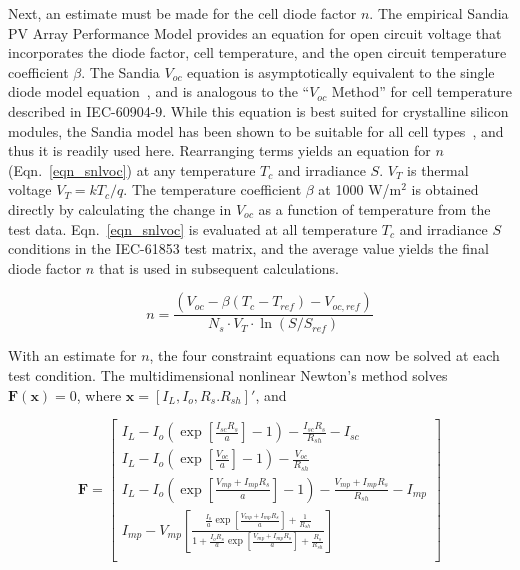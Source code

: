 \documentclass[12pt,letterpaper]{article}
\begin{document}
Next, an estimate must be made for the cell diode factor $n$.  The empirical Sandia PV Array Performance Model provides an equation for open circuit voltage that incorporates the diode factor, cell temperature, and the open circuit temperature coefficient $\beta$.  The Sandia $V_{oc}$ equation is asymptotically equivalent to the single diode model equation~\cite{hansen2013}, and is analogous to the ``$V_{oc}$ Method'' for cell temperature described in IEC-60904-9.  While this equation is best suited for crystalline silicon modules, the Sandia model has been shown to be suitable for all cell types~\cite{sapm}, and thus it is readily used here.  Rearranging terms yields an equation for $n$ (Eqn.~\ref{eqn_snlvoc}) at any temperature $T_c$ and irradiance $S$.  $V_T$ is thermal voltage $V_T=kT_c/q$.  The temperature coefficient $\beta$ at 1000 W/m$^2$ is obtained directly by calculating the change in $V_{oc}$ as a function of temperature from the test data.  Eqn.~\ref{eqn_snlvoc} is evaluated at all temperature $T_c$ and irradiance $S$ conditions in the IEC-61853 test matrix, and the average value yields the final diode factor $n$ that is used in subsequent calculations.

\begin{equation}\label{eqn_snlvoc}
n = \frac{ (V_{oc} - \beta( T_c - T_{ref} ) - V_{oc,ref}) }
            { N_s \cdot V_T \cdot \ln( S/S_{ref} ) }
\end{equation}

With an estimate for $n$, the four constraint equations can now be solved at each test condition.  The multidimensional nonlinear Newton's method solves $\mathbf{F}(\mathbf{x})=0$, where $\mathbf{x} = \left[ I_L,  I_o, R_s. R_{sh} \right]'$, and 

\begin{equation}
\mathbf{F} = \left[ \begin{array}{l} 
I_L - I_o\left(\exp\left[\frac{I_{sc}R_s}{a}\right]-1\right) - \frac{I_{sc}R_s}{R_{sh}} - I_{sc} \\ 

I_L - I_o\left(\exp \left[\frac{V_{oc}}{a}\right]-1\right) - \frac{V_{oc}}{R_{sh}} \\ 

I_L - I_o\left(\exp \left[\frac{V_{mp}+I_{mp}R_s}{a}\right]-1\right) - \frac{V_{mp}+I_{mp}R_s}{R_{sh}} - I_{mp} \\

I_{mp} - V_{mp}\left[ \frac{  \frac{I_o}{a}\exp\left[ \frac{V_{mp} + I_{mp}R_s}{a}\right] + \frac{1}{R_{sh}} } { 1  + \frac{I_o R_s}{a}\exp \left[ \frac{V_{mp} + I_{mp}R_s}{a}\right] + \frac{R_s}{R_{sh}} } \right] \\
\end{array} \right]
\end{equation}
\end{document}
